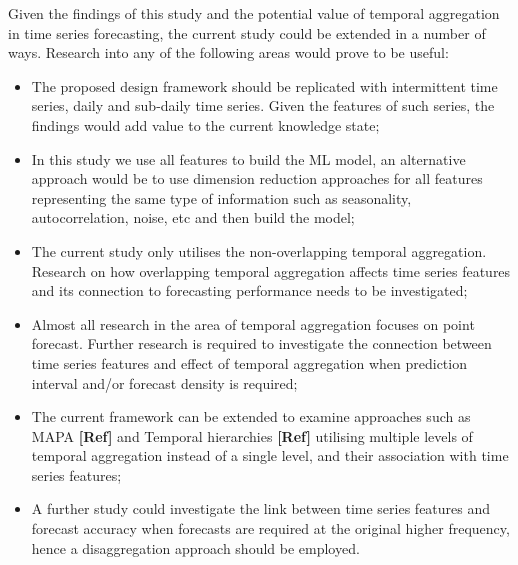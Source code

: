 \documentclass[preprint, 3p,
authoryear]{elsarticle} %
\begin{document}
Given the findings of this study and the potential value of temporal
aggregation in time series forecasting, the current study could be
extended in a number of ways. Research into any of the following areas
would prove to be useful:

\begin{itemize}
\item
  The proposed design framework should be replicated with intermittent
  time series, daily and sub-daily time series. Given the features of
  such series, the findings would add value to the current knowledge
  state;
\item
  In this study we use all features to build the ML model, an
  alternative approach would be to use dimension reduction approaches
  for all features representing the same type of information such as
  seasonality, autocorrelation, noise, etc and then build the model;
\item
  The current study only utilises the non-overlapping temporal
  aggregation. Research on how overlapping temporal aggregation affects
  time series features and its connection to forecasting performance
  needs to be investigated;
\item
  Almost all research in the area of temporal aggregation focuses on
  point forecast. Further research is required to investigate the
  connection between time series features and effect of temporal
  aggregation when prediction interval and/or forecast density is
  required;
\item
  The current framework can be extended to examine approaches such as
  MAPA \textbf{{[}Ref{]}} and Temporal hierarchies \textbf{{[}Ref{]}}
  utilising multiple levels of temporal aggregation instead of a single
  level, and their association with time series features;
\item
  A further study could investigate the link between time series
  features and forecast accuracy when forecasts are required at the
  original higher frequency, hence a disaggregation approach should be
  employed.
\end{itemize}

\renewcommand\refname{References}

\end{document}

